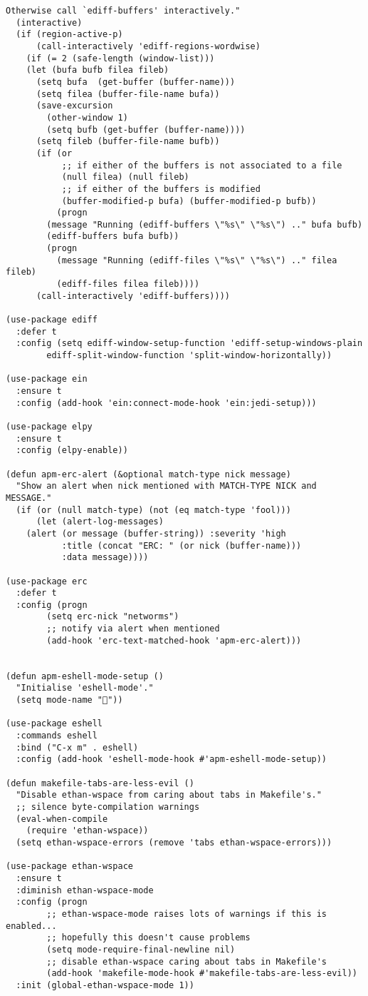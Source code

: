 \documentclass[11pt]{article}
\begin{document}
\begin{verbatim}
Otherwise call `ediff-buffers' interactively."
  (interactive)
  (if (region-active-p)
      (call-interactively 'ediff-regions-wordwise)
    (if (= 2 (safe-length (window-list)))
	(let (bufa bufb filea fileb)
	  (setq bufa  (get-buffer (buffer-name)))
	  (setq filea (buffer-file-name bufa))
	  (save-excursion
	    (other-window 1)
	    (setq bufb (get-buffer (buffer-name))))
	  (setq fileb (buffer-file-name bufb))
	  (if (or
	       ;; if either of the buffers is not associated to a file
	       (null filea) (null fileb)
	       ;; if either of the buffers is modified
	       (buffer-modified-p bufa) (buffer-modified-p bufb))
	      (progn
		(message "Running (ediff-buffers \"%s\" \"%s\") .." bufa bufb)
		(ediff-buffers bufa bufb))
	    (progn
	      (message "Running (ediff-files \"%s\" \"%s\") .." filea fileb)
	      (ediff-files filea fileb))))
      (call-interactively 'ediff-buffers))))

(use-package ediff
  :defer t
  :config (setq ediff-window-setup-function 'ediff-setup-windows-plain
		ediff-split-window-function 'split-window-horizontally))

(use-package ein
  :ensure t
  :config (add-hook 'ein:connect-mode-hook 'ein:jedi-setup)))

(use-package elpy
  :ensure t
  :config (elpy-enable))

(defun apm-erc-alert (&optional match-type nick message)
  "Show an alert when nick mentioned with MATCH-TYPE NICK and MESSAGE."
  (if (or (null match-type) (not (eq match-type 'fool)))
      (let (alert-log-messages)
	(alert (or message (buffer-string)) :severity 'high
	       :title (concat "ERC: " (or nick (buffer-name)))
	       :data message))))

(use-package erc
  :defer t
  :config (progn
	    (setq erc-nick "networms")
	    ;; notify via alert when mentioned
	    (add-hook 'erc-text-matched-hook 'apm-erc-alert)))


(defun apm-eshell-mode-setup ()
  "Initialise 'eshell-mode'."
  (setq mode-name ""))

(use-package eshell
  :commands eshell
  :bind ("C-x m" . eshell)
  :config (add-hook 'eshell-mode-hook #'apm-eshell-mode-setup))

(defun makefile-tabs-are-less-evil ()
  "Disable ethan-wspace from caring about tabs in Makefile's."
  ;; silence byte-compilation warnings
  (eval-when-compile
    (require 'ethan-wspace))
  (setq ethan-wspace-errors (remove 'tabs ethan-wspace-errors)))

(use-package ethan-wspace
  :ensure t
  :diminish ethan-wspace-mode
  :config (progn
	    ;; ethan-wspace-mode raises lots of warnings if this is enabled...
	    ;; hopefully this doesn't cause problems
	    (setq mode-require-final-newline nil)
	    ;; disable ethan-wspace caring about tabs in Makefile's
	    (add-hook 'makefile-mode-hook #'makefile-tabs-are-less-evil))
  :init (global-ethan-wspace-mode 1))


\end{verbatim}
\end{document}
